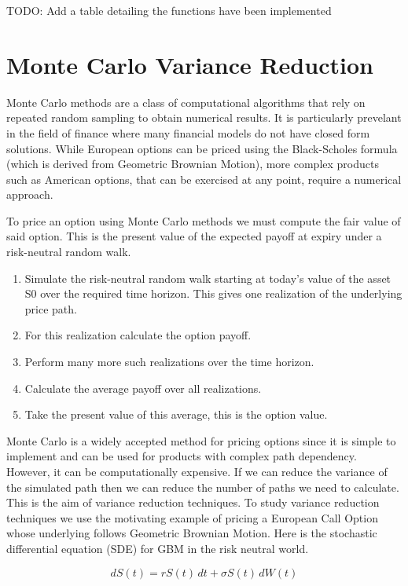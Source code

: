 \documentclass{article}
\newcommand{\para}{\vspace{8pt}} %
\begin{document}
TODO: Add a table detailing the functions have been implemented

\newpage

\section{Monte Carlo Variance Reduction}

Monte Carlo methods are a class of computational algorithms that rely on repeated random sampling to obtain numerical results. It is particularly prevelant in the field of finance
where many financial models do not have closed form solutions. While European options can be priced using the Black-Scholes formula (which is derived from Geometric Brownian Motion), more complex 
products such as American options, that can be exercised at any point, require a numerical approach. 

\para
To price an option using Monte Carlo methods we must compute the fair value of said option. This is the present value of the expected payoff at expiry under a risk-neutral random walk. 

\begin{enumerate}
    \item Simulate the risk-neutral random walk starting at today's value of the asset S0 over the required time horizon. This gives one realization of the underlying price path.
    \item For this realization calculate the option payoff.
    \item Perform many more such realizations over the time horizon.
    \item Calculate the average payoff over all realizations.
    \item Take the present value of this average, this is the option value.
\end{enumerate}

Monte Carlo is a widely accepted method for pricing options since it is simple to implement and can be used for products with complex path dependency. However, it can be computationally expensive.  If we 
can reduce the variance of the simulated path then we can reduce the number of paths we need to calculate. This is the aim of variance reduction techniques.  To study variance reduction techniques we use 
the motivating example of pricing a European Call Option whose underlying follows Geometric Brownian Motion. Here is the stochastic differential equation (SDE) for GBM in the risk neutral world. 

\[
dS(t) = r S(t) \, dt + \sigma S(t) \, dW(t)
\]
\end{document}
